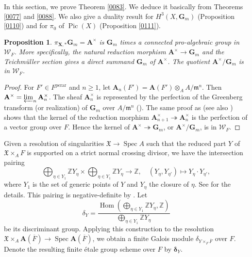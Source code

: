 \documentclass{amsart}
\newtheorem{Prop}[Thm]{Proposition}
\theoremstyle{remark}
\numberwithin{equation}{section}
\newcommand{\onto}{\twoheadrightarrow}
\newcommand{\tensor}{\mathbin{\otimes}}
\newcommand{\closure}[1]{\overline{#1}}
\newcommand{\Z}{\mathbb{Z}}
\newcommand{\Gm}{\mathbf{G}_{m}}
\newcommand{\invlim}{\varprojlim}
\newcommand{\perar}{\mathrm{perar}}
\newcommand{\alg}[1]{\mathbf{#1}}
\newcommand{\ideal}[1]{\mathfrak{#1}}
\newcommand{\varalg}[1]{\bm{#1}}
\DeclareMathOperator{\Hom}{Hom}
\DeclareMathOperator{\Spec}{Spec}
\DeclareMathOperator{\Pic}{Pic}
\begin{document}
In this section, we prove Theorem \ref{0083}.
We deduce it basically from Theorems \ref{0077} and \ref{0088}.
We also give a duality result for $H^{3}(X, \Gm)$
(Proposition \ref{0110})
and for $\pi_{0}$ of $\Pic(X)$
(Proposition \ref{0111}).

\begin{Prop} \label{0072}
	$\pi_{\alg{X}, \ast} \Gm = \alg{A}^{\times}$ is
	$\Gm$ times a connected pro-algebraic group in $\mathcal{W}_{F}$.
	More specifically,
	the natural reduction morphism $\alg{A}^{\times} \to \Gm$
	and the Teichm\"uller section gives a direct summand $\Gm$ of $\alg{A}^{\times}$.
	The quotient $\alg{A}^{\times} / \Gm$ is in $\mathcal{W}_{F}$.
\end{Prop}

\begin{proof}
	For $F' \in F^{\perar}$ and $n \ge 1$,
	let $\alg{A}_{n}(F') = \alg{A}(F') \tensor_{A} A / \ideal{m}^{n}$.
	Then $\alg{A}^{\times} = \invlim_{n} \alg{A}_{n}^{\times}$.
	The sheaf $\alg{A}_{n}^{\times}$ is represented by
	the perfection of the Greenberg transform (or realization) of $\Gm$ over $A / \ideal{m}^{n}$
	(\cite[Proposition-Definition 6.2]{BGA18Green}).
	The same proof as \cite[Proposition 11.1]{BGA18Green}
	(see also \cite[Proposition 5.6]{BS20}) shows that
	the kernel of the reduction morphism $\alg{A}_{n + 1}^{\times} \onto \alg{A}_{n}^{\times}$
	is the perfection of a vector group over $F$.
	Hence the kernel of $\alg{A}^{\times} \onto \Gm$, or $\alg{A}^{\times} / \Gm$,
	is in $\mathcal{W}_{F}$.
\end{proof}

Given a resolution of singularities $\mathfrak{X} \to \Spec A$
such that the reduced part $Y$ of $\mathfrak{X} \times_{A} F$ is supported on a strict normal crossing divisor,
we have the intersection pairing
	\begin{equation} \label{0104}
					\bigoplus_{\eta \in Y_{1}}
						\Z Y_{\eta}
				\times
					\bigoplus_{\eta \in Y_{1}}
						\Z Y_{\eta}
			\to
				\Z,
		\quad
				(Y_{\eta}, Y_{\eta'})
			\mapsto
				Y_{\eta} \cdot Y_{\eta'},
	\end{equation}
where $Y_{1}$ is the set of generic points of $Y$
and $Y_{\eta}$ the closure of $\eta$.
See \cite[Section 13]{Lip69} for the details.
This pairing is negative-definite by \cite[Lemma (14.1)]{Lip69}.
Let
	\[
			\delta_{Y}
		=
			\frac{
				\Hom(
					\bigoplus_{\eta \in Y_{1}}
						\Z Y_{\eta},
					\Z
				)
			}{
				\bigoplus_{\eta \in Y_{1}}
					\Z Y_{\eta}
			}
	\]
be its discriminant group.
Applying this construction to the resolution
$\mathfrak{X} \times_{A} \alg{A}(\closure{F}) \to \Spec \alg{A}(\closure{F})$,
we obtain a finite Galois module $\delta_{Y \times_{F} \closure{F}}$ over $F$.
Denote the resulting finite \'etale group scheme over $F$ by $\varalg{\delta}_{Y}$.
\end{document}
